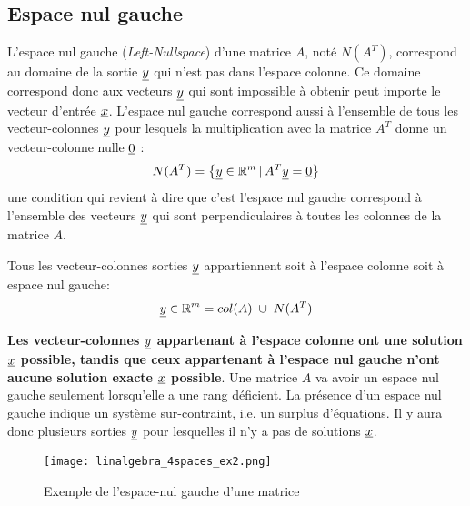 \subsection{Espace nul gauche}
\label{sec:leftnullspace}

L'espace nul gauche (\textit{Left-Nullspace}) d'une matrice $A$, noté $N(A^T)$, correspond au domaine de la sortie $\underline{y}$ qui n'est pas dans l'espace colonne. Ce domaine correspond donc aux vecteurs $\underline{y}$ qui sont impossible à obtenir peut importe le vecteur d'entrée $\underline{x}$. L'espace nul gauche correspond aussi à l'ensemble de tous les vecteur-colonnes $\underline{y}$ pour lesquels la multiplication avec la matrice $A^T$ donne un vecteur-colonne nulle $\underline{0}$ :
\begin{align}
N(A^T) = \left\{ \underline{y} \in \mathbb{R}^m \,|\, A^T\underline{y} = \underline{0} \right\}
\end{align}
une condition qui revient à dire que c'est l'espace nul gauche correspond à l'ensemble des vecteurs $\underline{y}$ qui sont perpendiculaires à toutes les colonnes de la matrice $A$.

Tous les vecteur-colonnes sorties $\underline{y}$ appartiennent soit à l'espace colonne soit à espace nul gauche:
\begin{align}
\col{y} \in \re^m = col(A) \; \cup \; N(A^T) %
\end{align}

\textbf{Les vecteur-colonnes $\underline{y}$ appartenant à l'espace colonne ont une solution $\underline{x}$ possible, tandis que ceux appartenant à l'espace nul gauche n'ont aucune solution exacte $\underline{x}$ possible}.
%
Une matrice $A$ va avoir un espace nul gauche seulement lorsqu'elle a une rang déficient. La présence d'un espace nul gauche indique un système sur-contraint, i.e. un surplus d'équations. Il y aura donc plusieurs sorties $\underline{y}$ pour lesquelles il n'y a pas de solutions $\underline{x}$.


\begin{example}
\begin{figure}[H]
	\centering
		\texttt{[image: linalgebra\_4spaces\_ex2.png]}
	\caption{Exemple de l'espace-nul gauche d'une matrice}
	\label{fig:4spaces_ex2}
\end{figure}
\end{example}




